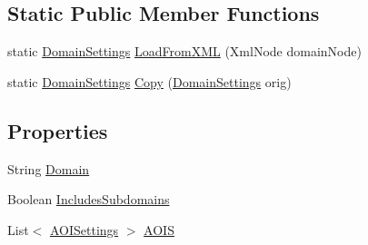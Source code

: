\subsection*{Static Public Member Functions}
\begin{DoxyCompactItemize}
\item 
static \hyperlink{class_web_analyzer_1_1_models_1_1_settings_model_1_1_domain_settings}{Domain\+Settings} \hyperlink{class_web_analyzer_1_1_models_1_1_settings_model_1_1_domain_settings_aadf710ba6a63d9fa929c8994fb2ebb12}{Load\+From\+X\+M\+L} (Xml\+Node domain\+Node)
\item 
static \hyperlink{class_web_analyzer_1_1_models_1_1_settings_model_1_1_domain_settings}{Domain\+Settings} \hyperlink{class_web_analyzer_1_1_models_1_1_settings_model_1_1_domain_settings_a1640b4ee95916081bf83ba1802c74c07}{Copy} (\hyperlink{class_web_analyzer_1_1_models_1_1_settings_model_1_1_domain_settings}{Domain\+Settings} orig)
\end{DoxyCompactItemize}
\subsection*{Properties}
\begin{DoxyCompactItemize}
\item 
String \hyperlink{class_web_analyzer_1_1_models_1_1_settings_model_1_1_domain_settings_ad85a389026a0f62a909f96456ac0cc80}{Domain}
\item 
Boolean \hyperlink{class_web_analyzer_1_1_models_1_1_settings_model_1_1_domain_settings_a55ea049e39a701dd4664daa1a53b1a92}{Includes\+Subdomains}
\item 
List$<$ \hyperlink{class_web_analyzer_1_1_models_1_1_settings_model_1_1_a_o_i_settings}{A\+O\+I\+Settings} $>$ \hyperlink{class_web_analyzer_1_1_models_1_1_settings_model_1_1_domain_settings_a70194a26a56aee579702914bdd7e5963}{A\+O\+I\+S}
\end{DoxyCompactItemize}
